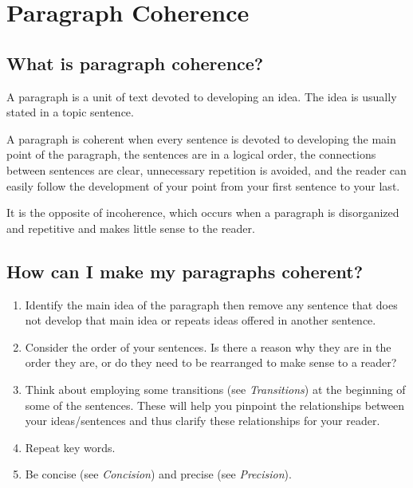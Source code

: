 
\chapter{Paragraph Coherence}

\section{What is paragraph coherence?}

A paragraph is a unit of text devoted to developing an idea. The idea is usually stated 
in a topic sentence.

A paragraph is coherent when every sentence is devoted to developing the main point 
of the paragraph, the sentences are in a logical order, the connections between 
sentences are clear, unnecessary repetition is avoided, and the reader can easily follow 
the development of your point from your first sentence to your last.

It is the opposite of incoherence, which occurs when a paragraph is disorganized and 
repetitive and makes little sense to the reader.

\section{How can I make my paragraphs coherent?}

\begin{enumerate}

\item Identify the main idea of the paragraph then remove any sentence that does not 
develop that main idea or repeats ideas offered in another sentence.

\item Consider the order of your sentences. Is there a reason why they are in the order 
they are, or do they need to be rearranged to make sense to a reader?

\item Think about employing some transitions (see \emph{Transitions}) at the beginning 
of some of the sentences. These will help you pinpoint the relationships between your 
ideas/sentences and thus clarify these relationships for your reader.

\item Repeat key words.

\item Be concise (see \emph {Concision}) and precise (see \emph{Precision}).
\end{enumerate}
 
